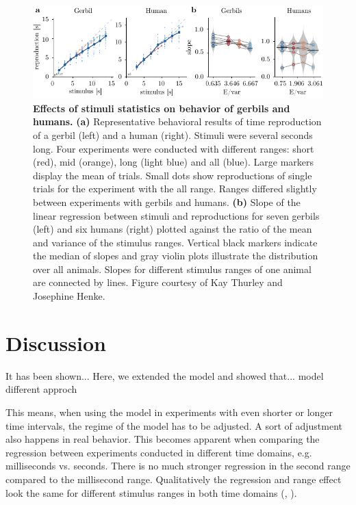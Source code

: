 \documentclass[10pt]{article}
\begin{document}
\begin{figure}[ht]
	\centering
	\includegraphics{figures/underestimation.pdf}
	\caption{\textbf{Effects of stimuli statistics on behavior of gerbils and humans.}
	\textbf{(a)} Representative behavioral results of time reproduction of a gerbil (left) and a human (right). Stimuli were several seconds long. Four experiments were conducted with different ranges: short (red), mid (orange), long (light blue) and all (blue). Large markers display the mean of trials. Small dots show reproductions of single trials for the experiment with the all range.
	Ranges differed slightly between experiments with gerbils and humans. 
	\textbf{(b)} Slope of the linear regression between stimuli and reproductions for seven gerbils (left) and six humans (right) plotted against the ratio of the mean and variance of the stimulus ranges. Vertical black markers indicate the median of slopes and gray violin plots illustrate the distribution over all animals. Slopes for different stimulus ranges of one animal are connected by lines. 
	Figure courtesy of Kay Thurley and Josephine Henke.
	}
\label{fig:underestimation}
\end{figure}

\section{Discussion}
It has been shown...
Here, we extended the model and showed that...
model different approch



This means, when using the model in experiments with even shorter or longer time intervals, the regime of the model has to be adjusted. 
A sort of adjustment also happens in real behavior. This becomes apparent when comparing the regression between experiments conducted in different time domains, e.g. milliseconds vs. seconds. There is no much stronger regression in the second range compared to the millisecond range. Qualitatively the regression and range effect look the same for different stimulus ranges in both time domains (\cite{Jazayeri2010}, \cite{Henke2021}). 
\end{document}
